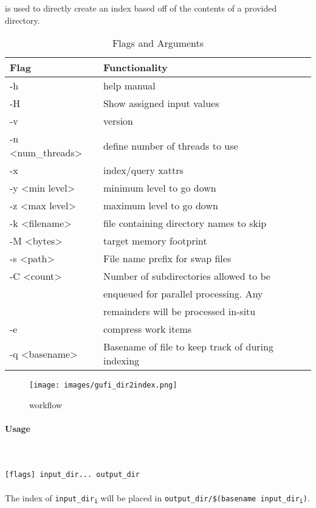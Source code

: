 \subsubsection{\gufidirindex}
\gufidirindex is used to directly create an index based off of the
contents of a provided directory.

\begin{table} [h!]
  \centering
  \begin{tabular}{l|l}
    Flag & Functionality \\
    \hline
    -h & help manual \\
    \hline
    -H & Show assigned input values \\
    \hline
    -v & version \\
    \hline
    -n \textless num\_threads\textgreater & define number of threads to use \\
    \hline
    -x & index/query xattrs \\
    \hline
    -y \textless min level\textgreater & minimum level to go down \\
    \hline
    -z \textless max level\textgreater & maximum level to go down \\
    \hline
    -k \textless filename\textgreater & file containing directory names to skip \\
    \hline
    -M \textless bytes\textgreater & target memory footprint \\
    \hline
    -s \textless path\textgreater & File name prefix for swap files \\
    \hline
    -C \textless count\textgreater & Number of subdirectories allowed to be \\
                                   & enqueued for parallel processing. Any \\
                                   & remainders will be processed in-situ \\
    \hline
    -e & compress work items \\
    \hline
    -q \textless basename\textgreater & Basename of file to keep track of during indexing \\
    \hline
  \end{tabular}
  \caption{\label{fig:Flags_for_dir2index} \gufidirindex Flags and Arguments}
\end{table}

\begin{figure} [h!]
  \centering
  \texttt{[image: images/gufi\_dir2index.png]}
  \caption{\label{fig:gufi_dir2index} \gufidirindex workflow}
\end{figure}

\paragraph{Usage} ~\\\\
\gufidirindex \texttt{[flags] input\_dir... output\_dir} \\\\
The index of \texttt{input\_dir\textsubscript{i}} will be placed in \texttt{output\_dir/\$(basename input\_dir\textsubscript{i})}.
